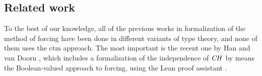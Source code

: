 \subsection{Related work}
To the best of our knowledge, all of the previous works in
formalization of the method 
of forcing have been done in different variants of type theory, and
none of them uses the ctm approach. The
most important is the recent one by 
Han and van Doorn
\cite{han_et_al:LIPIcs:2019:11074,DBLP:conf/cpp/HanD20}, which includes
a formalization of the independence of $\mathit{CH}$ by means
the Boolean-valued approach to forcing, using the Lean
proof assistant \cite{DBLP:conf/cade/MouraKADR15}.

